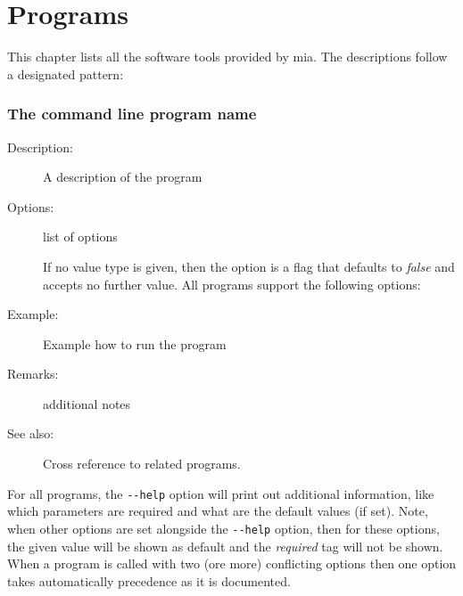 \documentclass[english, 10pt, a4paper,headsepline,openany]{scrbook}
\begin{document}
%

\chapter{Programs}
\label{ch:prog}


This chapter lists all the software tools provided by mia. 
The descriptions follow a designated pattern: 

\subsection*{The command line program name}
\begin{description}
\item [Description:]A description of the program
\item [Options:] list of options

\noindent 
{}

\noindent 
If no value type is given, then the option is a flag that defaults to \emph{false} and accepts no 
     further value. 
All programs support the following options: 


\item [Example:] Example how to run the program 

\item [Remarks:] additional notes
\item [See also:] Cross reference to related programs. 
\end{description}

For all programs, the \texttt{-{}-help} option will print out additional information, like which parameters 
  are required and what are the default values (if set).
Note, when other options are set alongside the \texttt{-{}-help} option, then for these options, the given value 
  will be shown as default and the \emph{required} tag will not be shown.
When a program is called with two (ore more) conflicting options then one option takes automatically precedence 
  as it is documented. 
\end{document}
